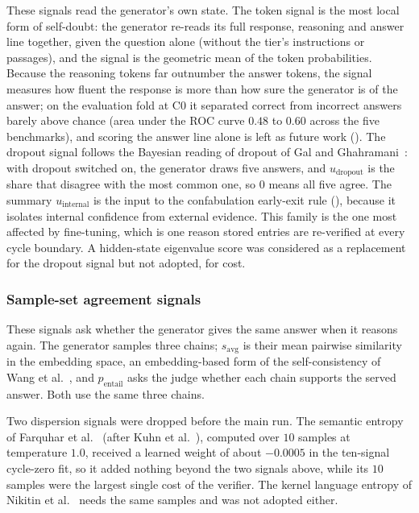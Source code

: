 These signals read the generator's own state. The token signal is the most local form of self-doubt: the generator re-reads its full response, reasoning and answer line together, given the question alone (without the tier's instructions or passages), and the signal is the geometric mean of the token probabilities. Because the reasoning tokens far outnumber the answer tokens, the signal measures how fluent the response is more than how sure the generator is of the answer; on the evaluation fold at C0 it separated correct from incorrect answers barely above chance (area under the ROC curve $0.48$ to $0.60$ across the five benchmarks), and scoring the answer line alone is left as future work (). The dropout signal follows the Bayesian reading of dropout of Gal and Ghahramani~\cite{pmlr-v48-gal16}: with dropout switched on, the generator draws five answers, and $u_{\text{dropout}}$ is the share that disagree with the most common one, so $0$ means all five agree. The summary $u_{\text{internal}}$ is the input to the confabulation early-exit rule (), because it isolates internal confidence from external evidence. This family is the one most affected by fine-tuning, which is one reason stored entries are re-verified at every cycle boundary. A hidden-state eigenvalue score \cite{chen2024inside} was considered as a replacement for the dropout signal but not adopted, for cost.

\subsubsection{Sample-set agreement signals}
\label{sec:verifier-sample-set}

These signals ask whether the generator gives the same answer when it reasons again. The generator samples three chains; $s_{\text{avg}}$ is their mean pairwise similarity in the embedding space, an embedding-based form of the self-consistency of Wang et al.~\cite{wang2023selfconsistency}, and $p_{\text{entail}}$ asks the judge whether each chain supports the served answer. Both use the same three chains.

Two dispersion signals were dropped before the main run. The semantic entropy of Farquhar et al.~\cite{farquhar2024semantic} (after Kuhn et al.~\cite{kuhn2023semantic}), computed over $10$ samples at temperature $1.0$, received a learned weight of about $-0.0005$ in the ten-signal cycle-zero fit, so it added nothing beyond the two signals above, while its $10$ samples were the largest single cost of the verifier. The kernel language entropy of Nikitin et al.~\cite{nikitin2024kle} needs the same samples and was not adopted either.

